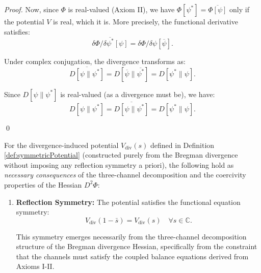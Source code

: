 \begin{theorem}
\begin{lemma}
\begin{proof}
Now, since $\Phi$ is real-valued (Axiom II), we have $\Phi[\psi^*] = \overline{\Phi[\psi]}$ only if the potential $V$ is real, which it is. More precisely, the functional derivative satisfies:
\begin{equation}
\overline{\delta\Phi/\delta\psi^*[\psi]} = \delta\Phi/\delta\psi[\overline{\psi}].
\end{equation}

Under complex conjugation, the divergence transforms as:
\begin{equation}
\overline{D[\psi \| \psi^*]} = D[\overline{\psi} \| \overline{\psi^*}] = D[\psi^* \| \psi].
\end{equation}

Since $D[\psi \| \psi^*]$ is real-valued (as a divergence must be), we have:
\begin{equation}
D[\psi \| \psi^*] = \overline{D[\psi \| \psi^*]} = D[\psi^* \| \psi].
\end{equation}

\qed

\end{proof}

\end{lemma}

\begin{theorem}
\label{thm:reflectionSymmetryEmergent}

For the divergence-induced potential $V_{\mathrm{div}}(s)$ defined in Definition \ref{def:symmetricPotential} (constructed purely from the Bregman divergence without imposing any reflection symmetry a priori), the following hold as \emph{necessary consequences} of the three-channel decomposition and the coercivity properties of the Hessian $D^2\Phi$:

\begin{enumerate}

\item \textbf{Reflection Symmetry:} The potential satisfies the functional equation symmetry:
\begin{equation}
V_{\mathrm{div}}(1-\bar{s}) = V_{\mathrm{div}}(s) \quad \forall s \in \mathbb{C}.
\end{equation}

This symmetry emerges necessarily from the three-channel decomposition structure of the Bregman divergence Hessian, specifically from the constraint that the channels must satisfy the coupled balance equations derived from Axioms I-II.


\end{enumerate}
\end{theorem}
\end{theorem}
